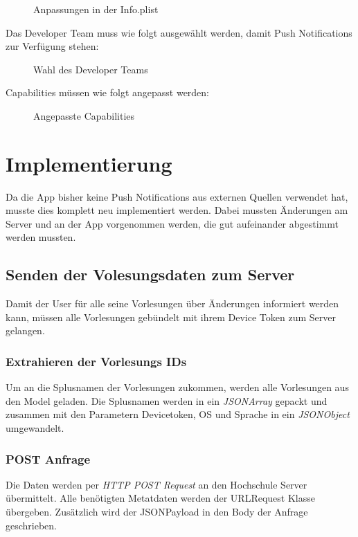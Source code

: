 \begin{figure}[H]
	\centering
	\caption{Anpassungen in der Info.plist}
	\label{plist}
\end{figure}


Das Developer Team muss wie folgt ausgewählt werden, damit Push Notifications zur Verfügung stehen:
\begin{figure}[H]
	\centering
	\caption{Wahl des Developer Teams}
	\label{devteam}
\end{figure}


Capabilities müssen wie folgt angepasst werden:

\begin{figure}[H]
	\centering
	\caption{Angepasste Capabilities}
	\label{capabilities}
\end{figure}

\newpage

\section{Implementierung}
Da die App bisher keine Push Notifications aus externen Quellen verwendet hat, musste dies komplett neu implementiert werden. Dabei mussten Änderungen am Server und  an der App vorgenommen werden, die gut aufeinander abgestimmt werden mussten.

\subsection{Senden der Volesungsdaten zum Server}
Damit der User für alle seine Vorlesungen über Änderungen informiert werden kann, müssen alle Vorlesungen gebündelt mit ihrem Device Token zum Server gelangen. 

\subsubsection{Extrahieren der Vorlesungs IDs}
Um an die Splusnamen der Vorlesungen zukommen, werden alle Vorlesungen aus den Model geladen. Die Splusnamen werden in ein \textit{JSONArray} gepackt und zusammen mit den Parametern Devicetoken, OS und Sprache in ein \textit{JSONObject} umgewandelt.


\newpage

\subsubsection{POST Anfrage}
Die Daten werden per \textit{HTTP POST Request} an den Hochschule Server übermittelt. Alle benötigten Metatdaten werden der URLRequest Klasse übergeben. Zusätzlich wird der JSONPayload in den Body der Anfrage geschrieben. 



